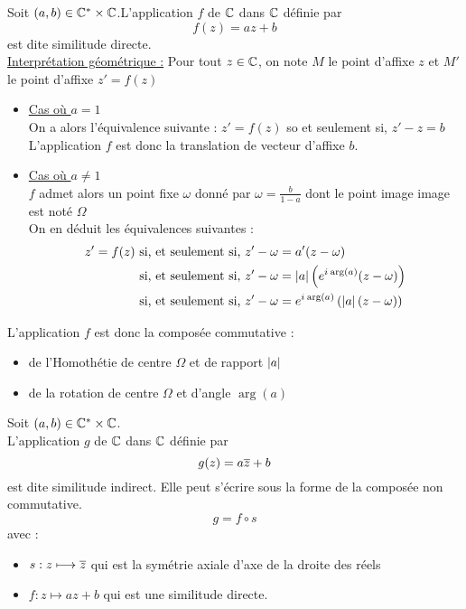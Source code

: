 \begin{defprop}
    Soit  \((a,b) \in \mathbb{C}^*\times\mathbb{C}\).L'application \(f\) de \(\mathbb{C}\) dans \(\mathbb{C}\) définie par 
    \[f(z) = az+b\]
    est dite similitude directe. \\
    \underline{Interprétation géométrique :}
    Pour tout \(z\in \mathbb{C}\), on note \(M\) le point d'affixe \(z\) et \(M'\) le point d'affixe \(z' = f(z)\)
    \begin{itemize}
        \item \underline{Cas où \(a=1\)} \\
        On a alors l'équivalence suivante : \(z' = f(z)\) so et seulement si, \(z'-z = b\) \\
        L'application \(f\) est donc la translation de vecteur d'affixe \(b\).
        \item\underline{Cas où \(a\neq1\)}\\ 
        \(f\) admet alors un point fixe \(\omega\) donné par \(\omega = \frac{b}{1-a} \) dont le point image image est noté \(\Omega\) \\
        On en déduit les équivalences suivantes :  \\
        \begin{align*}
            z' = f(z) &\text{ si, et seulement si, } z'-\omega = a'(z-\omega) \\
                      &\text{ si, et seulement si, } z'-\omega  = \left\lvert a\right\rvert\left(e^{i\mkern1mu \arg(a)}(z-\omega)\right) \\
                      &\text{ si, et seulement si, } z'-\omega  = e^{i\mkern1mu \arg(a)}\left(\left\lvert a\right\rvert(z-\omega)\right) \\
        \end{align*}
    \end{itemize}
    L'application \(f\) est donc la composée commutative : 
    \begin{itemize}
        \item de l'Homothétie de centre \(\Omega\) et de rapport \(\left\lvert a\right\rvert\)
        \item de la rotation de centre \(\Omega\) et d'angle \(\arg(a)\)
    \end{itemize}
\end{defprop}

\begin{defprop}
    Soit  \((a,b) \in \mathbb{C}^*\times\mathbb{C}\). \\
    L'application \(g\) de \(\mathbb{C}\) dans \(\mathbb{C}\) définie par 
    \[g(z) = a\overline{z}+b\]
    est dite similitude indirect. Elle peut s'écrire sous la forme de la composée non commutative. 
    \[g = f \circ s\]
    avec :
    \begin{itemize}
        \item \(s:z\longmapsto \overline{z}\) qui est la symétrie axiale d'axe de la droite des réels
        \item \(f:z\mapsto az+b\) qui est une similitude directe.
    \end{itemize}
\end{defprop}